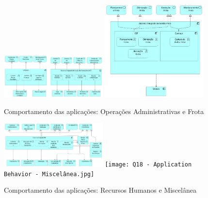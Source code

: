 \documentclass[12pt,a4paper,final]{article}
\begin{document}
    \begin{figure}[H]
        \centering
        \includegraphics[width=0.48\textwidth]{Q18 - Application Behavior- Admin Operations.jpg}
        \includegraphics[width=0.48\textwidth]{Q18 - Application Behavior- Fleet Management.jpg}
        \caption{Comportamento das aplicações: Operações Administrativas e Frota}
        \label{fig:q18-behavior-admin-frota}
    \end{figure}

    \begin{figure}[H]
        \centering
        \includegraphics[width=0.48\textwidth]{Q18 - Application Behavior- Human Ressources Management.jpg}
        \texttt{[image: Q18 - Application Behavior - Miscelânea.jpg]}
        \caption{Comportamento das aplicações: Recursos Humanos e Miscelânea}
        \label{fig:q18-behavior-rh-misc}
    \end{figure}
\end{document}
